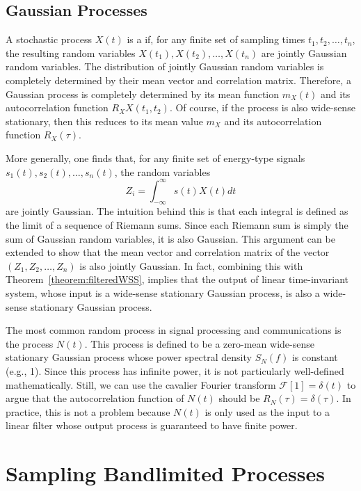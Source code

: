 \subsection{Gaussian Processes}

A stochastic process $X(t)$ is a  if, for any finite set of sampling times $t_1, t_2, \ldots, t_n$, the resulting random variables $X(t_1),X(t_2),\ldots,X(t_n)$ are jointly Gaussian random variables.
The distribution of jointly Gaussian random variables is completely determined by their mean vector and correlation matrix.
Therefore, a Gaussian process is completely determined by its mean function $m_X (t)$ and its autocorrelation function $R_XX (t_1,t_2)$.
Of course, if the process is also wide-sense stationary, then this reduces to its mean value $m_X$ and its autocorrelation function $R_X (\tau)$.

More generally, one finds that, for any finite set of energy-type signals $s_1 (t), s_2 (t), \ldots , s_n (t)$, the random variables
\[ Z_i = \int_{-\infty}^{\infty} s(t) X(t) dt \]
are jointly Gaussian.
The intuition behind this is that each integral is defined as the limit of a sequence of Riemann sums.
Since each Riemann sum is simply the sum of Gaussian random variables, it is also Gaussian.
This argument can be extended to show that the mean vector and correlation matrix of the vector $(Z_1, Z_2, \ldots, Z_n)$ is also jointly Gaussian.
In fact, combining this with Theorem~\ref{theorem:filteredWSS}, implies that the output of linear time-invariant system, whose input is a wide-sense stationary Gaussian process, is also a wide-sense stationary Gaussian process. 

The most common random process in signal processing and communications is the  process $N(t)$.
This process is defined to be a zero-mean wide-sense stationary Gaussian process whose power spectral density $S_N (f)$ is constant (e.g., 1).
Since this process has infinite power, it is not particularly well-defined mathematically.
Still, we can use the cavalier Fourier transform $\mathcal{F} [ 1 ] = \delta(t)$ to argue that the autocorrelation function of $N(t)$ should be $R_N (\tau) = \delta(\tau)$.
In practice, this is not a problem because $N(t)$ is only used as the input to a linear filter whose output process is guaranteed to have finite power.

\section{Sampling Bandlimited Processes}

